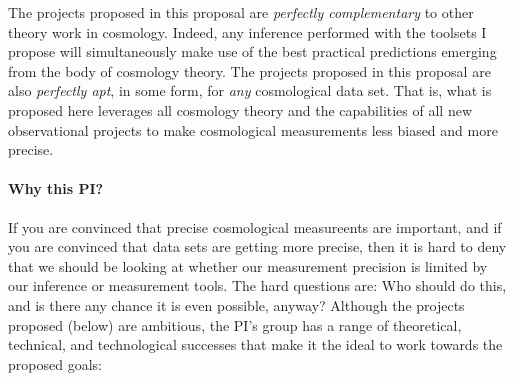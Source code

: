 \documentclass[12pt]{article}
\begin{document}
The projects proposed in this proposal are \emph{perfectly
  complementary} to other theory work in cosmology.
Indeed, any inference performed with the toolsets I propose will
simultaneously make use of the best practical predictions emerging
from the body of cosmology theory.
The projects proposed in this proposal are also \emph{perfectly apt},
in some form, for \emph{any} cosmological data set.
That is, what is proposed here leverages all cosmology theory and the
capabilities of all new observational projects to make cosmological
measurements less biased and more precise.

\paragraph{Why this PI?}

If you are convinced that precise cosmological measureents are
important, and if you are convinced that data sets are getting more
precise, then it is hard to deny that we should be looking at whether
our measurement precision is limited by our inference or measurement
tools.
The hard questions are: Who should do this, and is there any chance it
is even possible, anyway?
Although the projects proposed (below) are ambitious, the PI's group
has a range of theoretical, technical, and technological successes
that make it the ideal to work towards the proposed goals:
\end{document}
